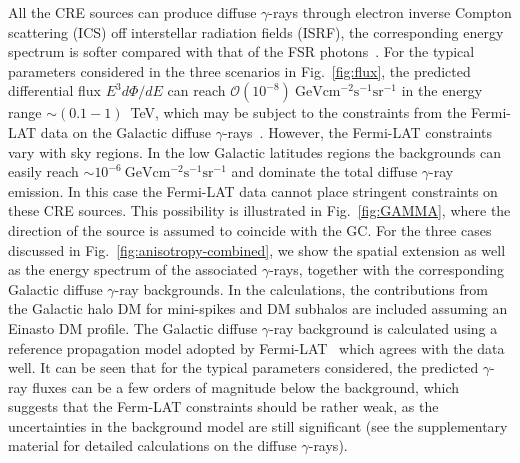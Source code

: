 \documentclass[aps,prl,twocolumn,a4paper]{revtex4}
\newcommand{\fig}[1]{Fig.~\ref{#1}}
\newcommand{\tx}[1]{\text{#1}}
\begin{document}
All the CRE sources can produce diffuse $\gamma$-rays through 
electron inverse Compton scattering (ICS) off 
interstellar radiation fields (ISRF),
the corresponding energy spectrum is softer compared with 
that of the FSR photons~\cite{Meade:2009iu}.
%
For the typical parameters considered in the three scenarios in \fig{fig:flux}, 
the predicted differential flux $E^{3}d\Phi/dE$ can reach 
$\mathcal{O}(10^{-8})~\tx{GeV}\tx{cm}^{-2}\tx{s}^{-1}\tx{sr}^{-1}$ 
in the energy range $\sim(0.1-1)$~TeV,
which may be subject to the constraints from the Fermi-LAT data 
on the Galactic diffuse $\gamma$-rays~\cite{Ackermann:2012rg}.
%
However, the Fermi-LAT constraints vary with sky regions.
In the  low Galactic latitudes regions the backgrounds can easily 
reach $\sim10^{-6}~\tx{GeV}\tx{cm}^{-2}\tx{s}^{-1}\tx{sr}^{-1}$
and dominate the total diffuse $\gamma$-ray  emission. 
In this case the  Fermi-LAT data cannot place stringent constraints 
on these CRE  sources.
This possibility is illustrated in \fig{fig:GAMMA}, where
the direction of the source is assumed to  coincide with the GC.
For the three cases discussed  in  \fig{fig:anisotropy-combined},
we show the spatial extension as well as the energy spectrum of the associated $\gamma$-rays,
together with the corresponding Galactic diffuse $\gamma$-ray backgrounds.
In the calculations, 
the contributions from the Galactic halo DM 
for mini-spikes and DM subhalos are included
assuming an Einasto DM profile.
%
The Galactic diffuse $\gamma$-ray background is 
calculated using a reference propagation model 
adopted by Fermi-LAT~\cite{Ackermann:2012pya}
which agrees with the data well.
%
It can be seen that for  the typical parameters  considered, 
the predicted $\gamma$-ray fluxes can be 
a few orders of magnitude below the background,
%
which suggests that the Ferm-LAT constraints should be 
rather weak, 
as the uncertainties in the background model are still significant
(see the supplementary material for detailed calculations on 
the diffuse $\gamma$-rays).
%
\end{document}

